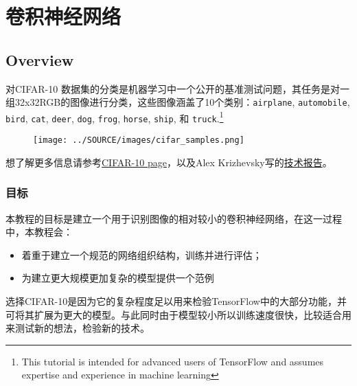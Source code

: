 



\newpage
\section {卷积神经网络} \label{cnn}

\subsection {Overview}


对CIFAR-10 数据集的分类是机器学习中一个公开的基准测试问题，其任务是对一组32x32RGB的图像进行分类，这些图像涵盖了10个类别：\lstinline{airplane}, \lstinline{automobile}, \lstinline{bird}, \lstinline{cat}, \lstinline{deer}, \lstinline{dog}, \lstinline{frog}, \lstinline{horse}, \lstinline{ship}, 和 \lstinline{truck}.\footnote{This tutorial is intended for advanced users of TensorFlow and assumes expertise and experience in machine learning}

\begin{figure}[htbp]
\centering
\texttt{[image: ../SOURCE/images/cifar\_samples.png]}
\caption{}
\end{figure}

想了解更多信息请参考\href{http://www.cs.toronto.edu/~kriz/cifar.html}{CIFAR-10 page}，以及Alex Krizhevsky写的\href{http://www.cs.toronto.edu/~kriz/learning-features-2009-TR.pdf}{技术报告}。

\subsubsection {目标}
本教程的目标是建立一个用于识别图像的相对较小的卷积神经网络，在这一过程中，本教程会：

\begin{itemize}
\item 着重于建立一个规范的网络组织结构，训练并进行评估；
\item 为建立更大规模更加复杂的模型提供一个范例
\end{itemize}

选择CIFAR-10是因为它的复杂程度足以用来检验TensorFlow中的大部分功能，并可将其扩展为更大的模型。与此同时由于模型较小所以训练速度很快，比较适合用来测试新的想法，检验新的技术。

